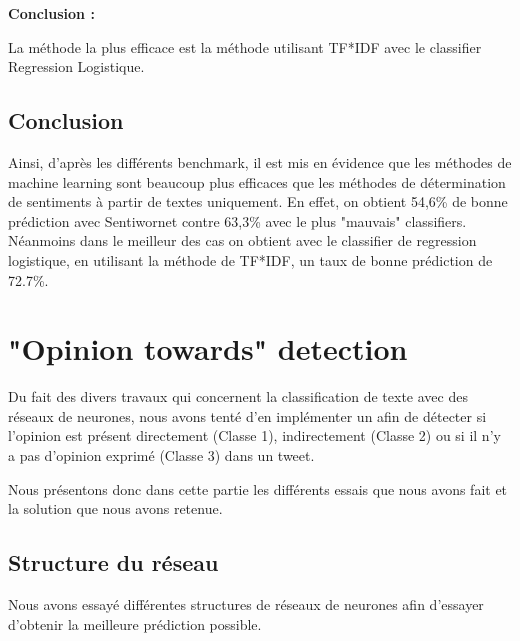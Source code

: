 \par \textbf{Conclusion :} \\
\par La méthode la plus efficace est la méthode utilisant TF*IDF avec le classifier Regression Logistique. \\


\subsection{Conclusion}

\par Ainsi, d'après les différents benchmark, il est mis en évidence que les méthodes de machine learning sont beaucoup plus efficaces que les méthodes de détermination de sentiments à partir de textes uniquement. En effet, on obtient 54,6\% de bonne prédiction avec Sentiwornet contre 63,3\% avec le plus "mauvais" classifiers. Néanmoins dans le meilleur des cas on obtient avec le classifier de regression logistique, en utilisant la méthode de TF*IDF, un taux de bonne prédiction de 72.7\%.


\section{"Opinion towards" detection}

\par Du fait des divers travaux qui concernent la classification de texte avec des réseaux de neurones\cite{cnn}\cite{rnn}, nous avons tenté d'en implémenter un afin de détecter si l'opinion est présent directement (Classe 1), indirectement (Classe 2) ou si il n'y a pas d'opinion exprimé (Classe 3) dans un tweet.

\par Nous présentons donc dans cette partie les différents essais que nous avons fait et la solution que nous avons retenue.

\subsection{Structure du réseau}

\par Nous avons essayé différentes structures de réseaux de neurones afin d'essayer d'obtenir la meilleure prédiction possible.

